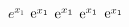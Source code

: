 \documentclass{article}
\begin{document}
$e^{x_1}$
$\cramped{\mathrm{e}^{x_1}}$
$\smash[t]{\mathrm{e}}^{x_1}$
$\smash{\mathrm{e}}^{x_1}$
$\cramped{\mathrm{e}^{x_1}}$
\end{document}
